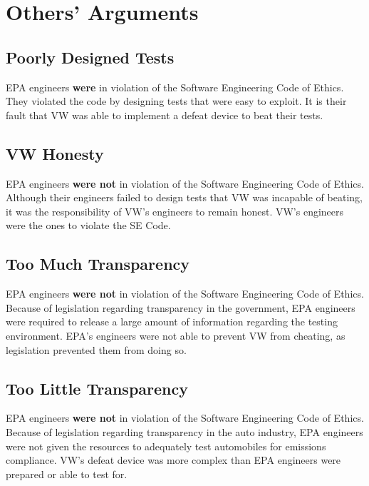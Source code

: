 
\section{Others' Arguments}

\subsection{Poorly Designed Tests}
EPA engineers \textbf{were} in violation of the Software Engineering Code of Ethics. They violated the code by designing tests that were easy to exploit. It is their fault that VW was able to implement a defeat device to beat their tests\cite{epa_track}.

\subsection{VW Honesty}
EPA engineers \textbf{were not} in violation of the Software Engineering Code of Ethics. Although their engineers failed to design tests that VW was incapable of beating, it was the responsibility of VW's engineers to remain honest. VW's engineers were the ones to violate the SE Code\cite{vw_ethics}.

\subsection{Too Much Transparency}
EPA engineers \textbf{were not} in violation of the Software Engineering Code of Ethics. Because of legislation regarding transparency in the government, EPA engineers were required to release a large amount of information regarding the testing environment. EPA's engineers were not able to prevent VW from cheating, as legislation prevented them from doing so\cite{vw_ethics}.

\subsection{Too Little Transparency}
EPA engineers \textbf{were not} in violation of the Software Engineering Code of Ethics. Because of legislation regarding transparency in the auto industry, EPA engineers were not given the resources to adequately test automobiles for emissions compliance. VW's defeat device was more complex than EPA engineers were prepared or able to test for\cite{cheating_analysis}.